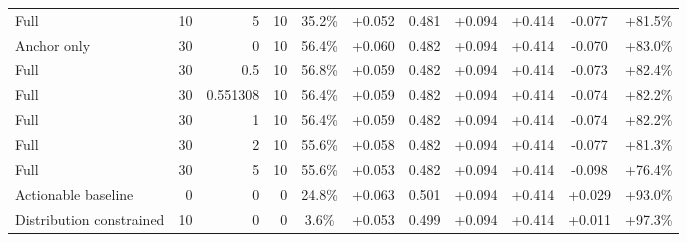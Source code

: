 \begin{table}[htbp]
\begin{tabular}{lrrrccccccc}
Full & 10 & 5 & 10 & 35.2\% & +0.052 & 0.481 & +0.094 & +0.414 & -0.077 & +81.5\% \\
Anchor only & 30 & 0 & 10 & 56.4\% & +0.060 & 0.482 & +0.094 & +0.414 & -0.070 & +83.0\% \\
Full & 30 & 0.5 & 10 & 56.8\% & +0.059 & 0.482 & +0.094 & +0.414 & -0.073 & +82.4\% \\
Full & 30 & 0.551308 & 10 & 56.4\% & +0.059 & 0.482 & +0.094 & +0.414 & -0.074 & +82.2\% \\
Full & 30 & 1 & 10 & 56.4\% & +0.059 & 0.482 & +0.094 & +0.414 & -0.074 & +82.2\% \\
Full & 30 & 2 & 10 & 55.6\% & +0.058 & 0.482 & +0.094 & +0.414 & -0.077 & +81.3\% \\
Full & 30 & 5 & 10 & 55.6\% & +0.053 & 0.482 & +0.094 & +0.414 & -0.098 & +76.4\% \\
Actionable baseline & 0 & 0 & 0 & 24.8\% & +0.063 & 0.501 & +0.094 & +0.414 & +0.029 & +93.0\% \\
Distribution constrained & 10 & 0 & 0 & 3.6\% & +0.053 & 0.499 & +0.094 & +0.414 & +0.011 & +97.3\% \\
\bottomrule
\end{tabular}
\end{table}